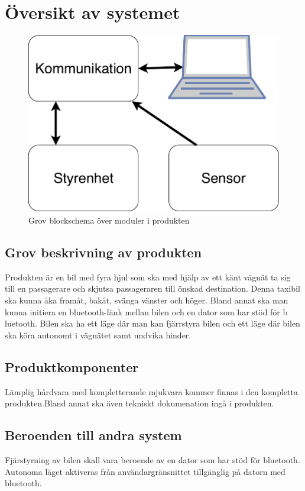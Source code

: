 \documentclass[kravspec/krav.tex]{subfiles}
\begin{document}
\section{Översikt av systemet}

\begin{figure}[h]
    \centering
    \includegraphics[width=0.6\linewidth]{kravspec/figures/overview-schema.pdf}
    \caption{Grov blockschema över moduler i produkten}
    \label{fig:overview}
\end{figure}

\subsection{Grov beskrivning av produkten}
Produkten är en bil med fyra hjul som ska med hjälp av ett känt vägnät ta sig
till en passagerare och skjutsa passageraren till önskad destination. Denna
taxibil ska kunna åka framåt, bakåt, svänga vänster och höger.  Bland annat ska
man kunna initiera en bluetooth-länk mellan bilen och en dator som har stöd för
b    luetooth. Bilen ska ha ett läge där man kan fjärrstyra bilen och ett läge där
bilen ska köra autonomt i vägnätet samt undvika hinder.

\subsection{Produktkomponenter}
Lämplig hårdvara med kompletterande mjukvara kommer finnas i den kompletta
produkten.Bland annat ska även tekniskt dokumenation ingå i produkten.

\subsection{Beroenden till andra system}
Fjärstyrning av bilen skall vara beroende av en dator som har stöd för bluetooth.
Autonoma läget aktiveras från användargränsnittet tillgänglig på datorn med
bluetooth.
\end{document}
